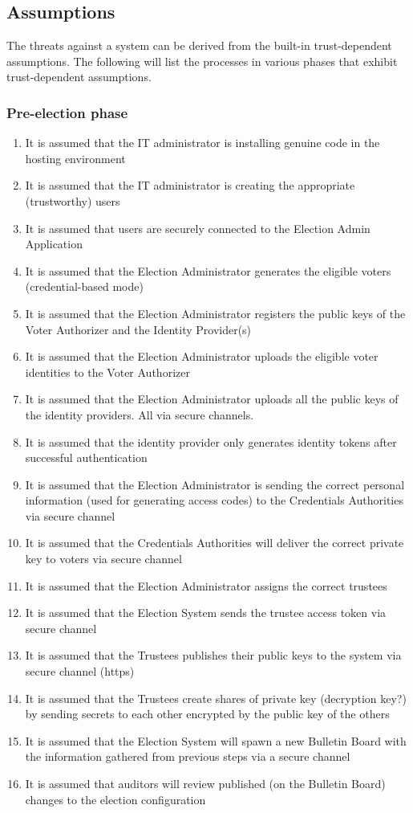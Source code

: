 \subsection{Assumptions} \label{sec: assumptions}
The threats against a system can be derived from the built-in trust-dependent assumptions. The following will list the processes in various phases that exhibit trust-dependent assumptions.


\subsubsection{Pre-election phase} 

\begin{enumerate}
\item It is assumed that the IT administrator is installing genuine code in the hosting environment
\item It is assumed that the IT administrator is creating the appropriate (trustworthy) users
\item It is assumed that users are securely connected to the Election Admin Application
\item It is assumed that the Election Administrator generates the eligible voters (credential-based mode)
\item It is assumed that the Election Administrator registers the public keys of the Voter Authorizer and the Identity Provider(s)
\item It is assumed that the Election Administrator uploads the eligible voter identities to the Voter Authorizer
\item It is assumed that the Election Administrator uploads all the public keys of the identity providers. All via secure channels.
\item It is assumed that the identity provider only generates identity tokens after successful authentication
\item It is assumed that the Election Administrator is sending the correct personal information (used for generating access codes) to the Credentials Authorities via secure channel
\item It is assumed that the Credentials Authorities will deliver the correct private key to voters via secure channel
\item It is assumed that the Election Administrator assigns the correct trustees
\item It is assumed that the Election System sends the trustee access token via secure channel
\item It is assumed that the Trustees publishes their public keys to the system via secure channel (https)
\item It is assumed that the Trustees create shares of private key (decryption key?) by sending secrets to each other encrypted by the public key of the others
\item It is assumed that the Election System will spawn a new Bulletin Board with the information gathered from previous steps via a secure channel
\item It is assumed that auditors will review published (on the Bulletin Board) changes to the election configuration
\end{enumerate}


